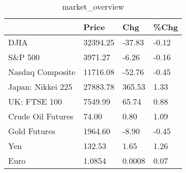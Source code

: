 \documentclass{article}%
\begin{document}
%


\begin{table}[htbp]%
\caption{market\_overview}%
\centering%
\begin{adjustbox}{width=1\textwidth}%
\begin{tabular}{llll}
\toprule
                  &    Price &    Chg &  \%Chg \\
\midrule
             DJIA & 32394.25 & -37.83 & -0.12 \\
          S\&P 500 &  3971.27 &  -6.26 & -0.16 \\
 Nasdaq Composite & 11716.08 & -52.76 & -0.45 \\
Japan: Nikkei 225 & 27883.78 & 365.53 &  1.33 \\
     UK: FTSE 100 &  7549.99 &  65.74 &  0.88 \\
Crude Oil Futures &    74.00 &   0.80 &  1.09 \\
     Gold Futures &  1964.60 &  -8.90 & -0.45 \\
              Yen &   132.53 &   1.65 &  1.26 \\
             Euro &   1.0854 & 0.0008 &  0.07 \\
\bottomrule
\end{tabular}
%
\end{adjustbox}%
\end{table}

%
\end{document}
